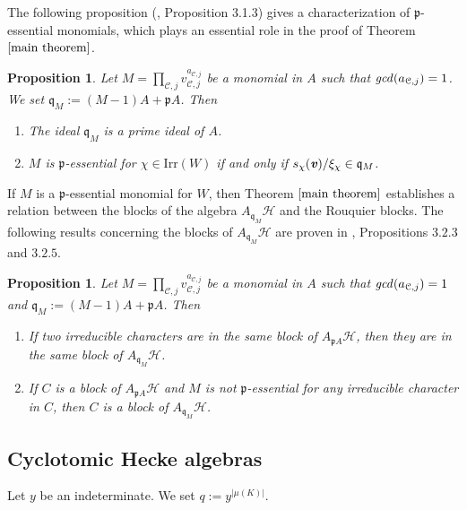 \documentclass[10pt,a4paper,titlepage]{article}
\newtheorem{proposition}[theorem]{Proposition}
\begin{document}
The following proposition (\cite{Chlou}, Proposition 3.1.3) gives a characterization of $\mathfrak{p}$-essential monomials, which plays an essential role in the proof of Theorem $\ref{main theorem}$. 

\begin{proposition}\label{p-essential}
Let  $M = \prod_{\mathcal{C},j} v_{\mathcal{C},j}^{a_{\mathcal{C},j}}$ be a monomial in $A$
such that $\textrm{\emph{gcd}}(a_{\mathcal{C},j})=1$. We set  $\mathfrak{q}_M:=(M-1)A +\mathfrak{p}A$.
Then
\begin{enumerate}
\item The ideal $\mathfrak{q}_M$ is a prime ideal of $A$. 
\item $M$ is $\mathfrak{p}$-essential for $\chi \in \mathrm{Irr}(W)$ if and only if
$s_\chi(\textbf{\emph{v}})/\xi_\chi \in \mathfrak{q}_M$.
\end{enumerate}
\end{proposition}

If $M$ is a $\mathfrak{p}$-essential monomial for $W$, then Theorem $\ref{main theorem}$ establishes a relation between the blocks of the algebra
$A_{\mathfrak{q}_M}\mathcal{H}$ and the Rouquier blocks. The following results concerning the blocks of $A_{\mathfrak{q}_M}\mathcal{H}$ are proven in \cite{Chlou}, Propositions $3.2.3$ and $3.2.5$. 

\begin{proposition}\label{not essential for block}
Let $M = \prod_{\mathcal{C},j} v_{\mathcal{C},j}^{a_{\mathcal{C},j}}$ be a monomial in $A$
such that $\textrm{\emph{gcd}}(a_{\mathcal{C},j})=1$ and  $\mathfrak{q}_M:=(M-1)A +\mathfrak{p}A$.
Then
\begin{enumerate}
\item If two irreducible characters are in the same block of $A_{\mathfrak{p}A}\mathcal{H}$, then they are in the same block of $A_{\mathfrak{q}_M}\mathcal{H}$.
\item If $C$ is a block of $A_{\mathfrak{p}A}\mathcal{H}$ and $M$ is not $\mathfrak{p}$-essential for any irreducible character in $C$, then $C$ is a block of $A_{\mathfrak{q}_M}\mathcal{H}$.
\end{enumerate}
\end{proposition}

\subsection {Cyclotomic Hecke algebras}

Let $y$ be an indeterminate. We set $q:=y^{|\mu(K)|}.$
\end{document}
